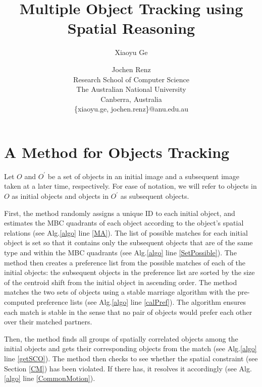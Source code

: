 \documentclass[letterpaper]{article}
\title{Multiple Object Tracking using Spatial Reasoning}
\author{Xiaoyu Ge \and Jochen Renz \\
Research School of Computer Science\\
The Australian National University \\
Canberra, Australia\\
\{xiaoyu.ge, jochen.renz\}@anu.edu.au
}
\begin{document}
\section{A Method for Objects Tracking}
Let $O$ and $O^{\prime}$ be a set of objects in an initial image and a subsequent image taken at a later time, respectively. For ease of notation, we will refer to objects in $O$ as initial objects and objects in $O^{\prime}$ as subsequent objects.

First, the method randomly assigns a unique ID to each initial object, and estimates the MBC quadrants of each object according to the object's spatial relations (see Alg.\ref{algo} line \ref{MA}). The list of possible matches for each initial object is set so that it contains only the subsequent objects that are of the same type and within the MBC quadrants (see Alg.\ref{algo} line \ref{SetPossible}). The method then creates a preference list from the possible matches of each of the initial objects: the subsequent objects in the preference list are sorted by the size of the centroid shift from the initial object in ascending order. The method matches the two sets of objects using a stable marriage algorithm \cite{gale1962college} with the pre-computed preference lists (see Alg.\ref{algo} line \ref{calPref}). The algorithm ensures each match is stable in the sense that no pair of objects would prefer each other over their matched partners. 

Then, the method finds all groups of spatially correlated objects among the initial objects and gets their corresponding objects from the match (see Alg.\ref{algo} line \ref{getSCO}). The method then checks to see whether the spatial constraint (see Section \ref{CM}) has been violated. If there has, it resolves it accordingly (see Alg.\ref{algo} line \ref{CommonMotion}).
\end{document}
